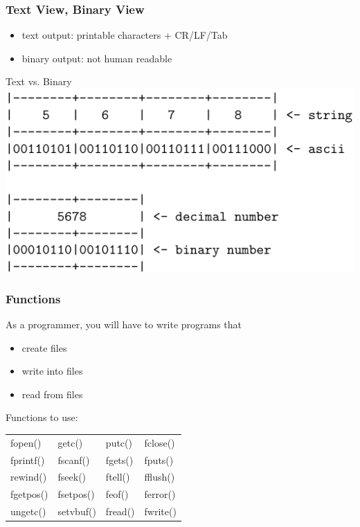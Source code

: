\documentclass[hyperref={xetex,colorlinks,linkcolor=blue},green,compress]{beamer}
\begin{document}
\begin{frame}\frametitle{Text View, Binary View}
  \begin{itemize}
  \item text output: printable characters + CR/LF/Tab
  \item binary output: not human readable
  \end{itemize}
  \begin{exampleblock}{Text vs. Binary}
    \includegraphics[width=\textwidth]{5678}
  \end{exampleblock}
\end{frame}

\begin{frame}\frametitle{Functions}
  As a programmer, you will have to write programs that
  \begin{itemize}
  \item create files
  \item write into files
  \item read from files
  \end{itemize}
  \begin{exampleblock}{Functions to use:}
    \begin{center}
      \begin{tabular}{llll}
        fopen()&getc()&putc()&fclose()\\
        fprintf()&fscanf()&fgets()&fputs()\\
        rewind()&fseek()&ftell()&fflush()\\
        fgetpos()&fsetpos()&feof()&ferror()\\
        ungetc()&setvbuf()&fread()&fwrite()
      \end{tabular}
    \end{center}
  \end{exampleblock}
\end{frame}
\end{document}
